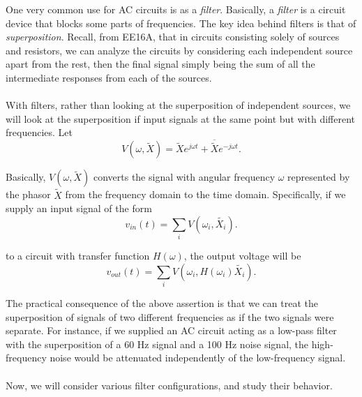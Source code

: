 
One very common use for AC circuits is as a \emph{filter}.
Basically, a \emph{filter} is a circuit device that blocks some parts of frequencies.
The key idea behind filters is that of \emph{superposition}.
Recall, from EE16A, that in circuits consisting solely of sources and resistors, we can analyze the circuits by considering each independent source apart from the rest, then the final signal simply being the sum of all the intermediate responses from each of the sources.
\\
\\
With filters, rather than looking at the superposition of independent sources, we will look at the superposition if input signals at the same point but with different frequencies.
Let
\[
  V(\omega, \widetilde{X}) = \widetilde{X}e^{j \omega t} + \overline{\widetilde{X}}e^{-j \omega t}
.\]

Basically, $V(\omega, \widetilde{X})$ converts the signal with angular frequency $\omega$ represented by the phasor $\widetilde{X}$ from the frequency domain to the time domain.
Specifically, if we supply an input signal of the form
\[
  v_{in}(t) = \sum_i V(\omega_i, \widetilde{X_i})
.\]

to a circuit with transfer function $H(\omega)$, the output voltage will be
\[
  v_{out}(t) = \sum_i V(\omega_i, H(\omega_i)\widetilde{X_i})
.\]

The practical consequence of the above assertion is that we can treat the superposition of signals of two different frequencies as if the two signals were separate.
For instance, if we supplied an AC circuit acting as a low-pass filter with the superposition of a 60 Hz signal and a 100 Hz noise signal, the high-frequency noise would be attenuated independently of the low-frequency signal.
\\
\\
Now, we will consider various filter configurations, and study their behavior.



